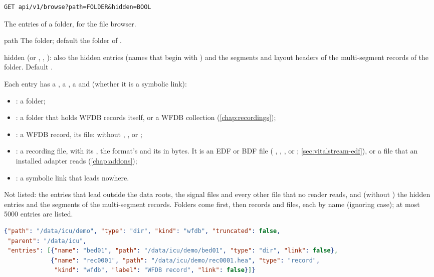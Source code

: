 \begin{lstlisting}[style=signature]
GET api/v1/browse?path=FOLDER&hidden=BOOL
\end{lstlisting}
The entries of a folder, for the file browser.
\begin{params}
\item[path] The folder; default the  folder of .
\item[hidden]  (or , , ): also the hidden entries (names
  that begin with ) and the segments and layout headers of the multi-segment records of
  the folder. Default .
\end{params}
Each entry has a , a , a  and  (whether it is a
symbolic link):
\begin{itemize}
\item {}: a folder;
\item {}: a folder that holds WFDB records itself, or a WFDB collection
  (\cref{chap:recordings});
\item {}: a WFDB record, its  file:  without ,
   ,   or ;
\item {}: a recording file, with its , the format's  and its
   in bytes. It is an EDF or BDF file ( , 
  , ,  or ; \cref{sec:vitalstream-edf}), or a file
  that an installed adapter reads (\cref{chap:addons});
\item {}: a symbolic link that leads nowhere.
\end{itemize}
Not listed: the entries that lead outside the data roots, the signal files and every other file
that no reader reads, and (without ) the hidden entries and the segments of the
multi-segment records. Folders come first, then records and files, each by name (ignoring
case); at most 5000 entries are listed.
\begin{lstlisting}[language=JSON]
{"path": "/data/icu/demo", "type": "dir", "kind": "wfdb", "truncated": false,
 "parent": "/data/icu",
 "entries": [{"name": "bed01", "path": "/data/icu/demo/bed01", "type": "dir", "link": false},
             {"name": "rec0001", "path": "/data/icu/demo/rec0001.hea", "type": "record",
              "kind": "wfdb", "label": "WFDB record", "link": false}]}
\end{lstlisting}

